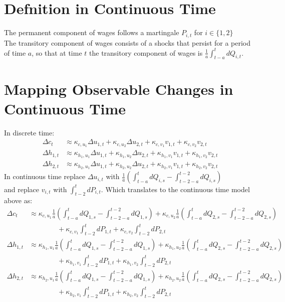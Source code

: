 \documentclass[]{article}
\begin{document}
\section{Defnition in Continuous Time}
The permanent component of wages follows a martingale $P_{i,t}$ for $i \in \{1,2\}$ \\
The transitory component of wages consists of a shocks that persist for a period of time $a$, so that at time $t$ the transitory component of wages is $\frac{1}{a}\int_{t-a}^t dQ_{i,t}$. \\
\section{Mapping Observable Changes in Continuous Time}
In discrete time:
\begin{align*}
\Delta c_t & \approx \kappa_{c, u_1} \Delta u_{1,t} + \kappa_{c, u_2} \Delta u_{2,t} + \kappa_{c, v_1} v_{1,t} + \kappa_{c, v_2} v_{2,t} \\
\Delta h_{1,t} &  \approx \kappa_{h_1, u_1} \Delta u_{1,t} + \kappa_{h_1, u_2} \Delta u_{2,t} + \kappa_{h_1, v_1} v_{1,t} + \kappa_{h_1, v_2} v_{2,t} \\
\Delta h_{2,t} &  \approx \kappa_{h_2, u_1} \Delta u_{1,t} + \kappa_{h_2, u_2} \Delta u_{2,t} + \kappa_{h_2, v_1} v_{1,t} + \kappa_{h_2, v_2} v_{2,t}
\end{align*}
In continuous time replace $\Delta u_{i,t}$ with $\frac{1}{a} \left( \int_{t-a}^t dQ_{i,s}  -  \int_{t-2-a}^{t-2} dQ_{i,s} \right)$ \\
and replace $ v_{i,t}$ with $\int_{t-2}^t dP_{i,t}$.
Which translates to the continuous time model above as:
\begin{align*}
\Delta c_t&  \approx \kappa_{c, u_1} \frac{1}{a}\left( \int_{t-a}^t dQ_{1,s}  -  \int_{t-2-a}^{t-2} dQ_{1,s} \right)+ \kappa_{c, u_2} \frac{1}{a}\left( \int_{t-a}^t dQ_{2,s}  -  \int_{t-2-a}^{t-2} dQ_{2,s} \right) \\
& \qquad \qquad + \kappa_{c, v_1}\int_{t-2}^t dP_{1,t} + \kappa_{c, v_2}\int_{t-2}^t dP_{2,t}\\
\Delta h_{1,t} & \approx \kappa_{h_1, u_1}  \frac{1}{a}\left( \int_{t-a}^t dQ_{1,s}  -  \int_{t-2-a}^{t-2} dQ_{1,s} \right) + \kappa_{h_1, u_2} \frac{1}{a}\left( \int_{t-a}^t dQ_{2,s}  -  \int_{t-2-a}^{t-2} dQ_{2,s} \right) \\
& \qquad \qquad + \kappa_{h_1, v_1}\int_{t-2}^t dP_{1,t} + \kappa_{h_1, v_2} \int_{t-2}^t dP_{2,t} \\
\Delta h_{2,t} & \approx \kappa_{h_2, u_1} \frac{1}{a}\left( \int_{t-a}^t dQ_{1,s}  -  \int_{t-2-a}^{t-2} dQ_{1,s} \right) + \kappa_{h_2, u_2}  \frac{1}{a}\left( \int_{t-a}^t dQ_{2,s}  -  \int_{t-2-a}^{t-2} dQ_{2,s} \right) \\
& \qquad \qquad + \kappa_{h_2, v_1}\int_{t-2}^t dP_{1,t} + \kappa_{h_2, v_2} \int_{t-2}^t dP_{2,t}
\end{align*}
\end{document}
